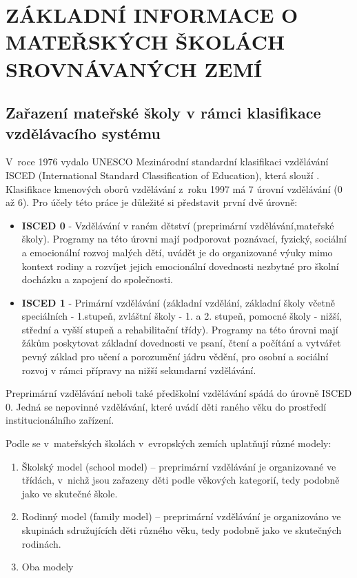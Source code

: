 	
\chapter{ZÁKLADNÍ INFORMACE O MATEŘSKÝCH ŠKOLÁCH SROVNÁVANÝCH ZEMÍ}

	\section{Zařazení mateřské školy v rámci klasifikace vzdělávacího systému}

		V roce 1976 vydalo UNESCO Mezinárodní standardní klasifikaci vzdělávání ISCED (International Standard Classification of Education), která slouží  \citep{ISCED}. Klasifikace kmenových oborů vzdělávání z roku 1997 má 7 úrovní vzdělávání (0 až 6).
		Pro účely této práce je důležité si představit první dvě úrovně:

\begin{itemize}
	\setlength\itemsep{-2mm}
	\item [] \textbf{ISCED 0} - Vzdělávání v raném dětství (preprimární vzdělávání,mateřské školy). Programy na této úrovni mají podporovat poznávací, fyzický, sociální a emocionální rozvoj malých dětí, uvádět je do organizované výuky mimo kontext rodiny a rozvíjet jejich emocionální dovednosti nezbytné pro školní docházku a zapojení do společnosti. 
	\item [] \textbf{ISCED 1} - Primární vzdělávání (základní vzdělání, základní školy včetně speciálních - 1.stupeň, zvláštní školy - 1. a 2. stupeň, pomocné školy - nižší, střední a vyšší stupeň a rehabilitační třídy). Programy na této úrovni mají žákům poskytovat základní dovednosti ve psaní, čtení a počítání a vytvářet pevný základ pro učení a porozumění jádru vědění, pro osobní a sociální rozvoj v rámci přípravy na nižší sekundarní vzdělávání. \citep{ISCED}
\end{itemize}

		Preprimární vzdělávání neboli také předškolní vzdělávání spádá do úrovně ISCED 0. Jedná se nepovinné vzdělávání, které uvádí děti raného věku do prostředí institucionálního zařízení. 

		Podle \citet{KeyData} se v mateřských školách v evropských zemích uplatňují různé modely:
		\begin{enumerate}[1)]
			\setlength\itemsep{-2mm}
			\item Školský model (school model) – preprimární vzdělávání je organizované ve třídách, v nichž jsou zařazeny děti podle věkových kategorií, tedy podobně jako ve skutečné škole. 
			\item Rodinný model (family model) – preprimární vzdělávání je organizováno ve skupinách sdružujících děti různého věku, tedy podobně jako ve skutečných rodinách. 
			\item Oba modely
		\end{enumerate}

